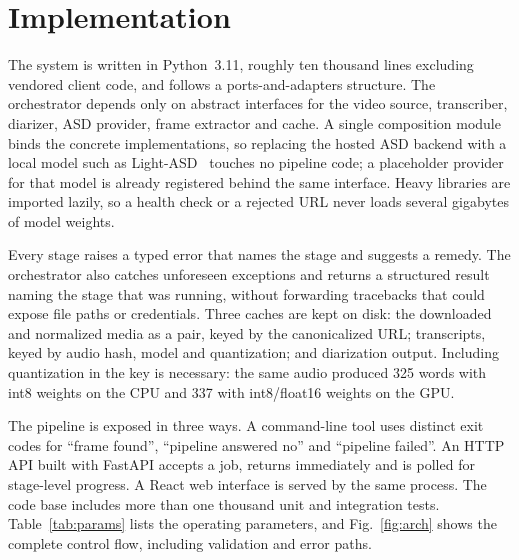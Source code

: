 \documentclass[conference]{IEEEtran}
\begin{document}
\section{Implementation}
\label{sec:impl}

The system is written in Python~3.11, roughly ten thousand lines excluding vendored client code, and follows a ports-and-adapters structure. The orchestrator depends only on abstract interfaces for the video source, transcriber, diarizer, ASD provider, frame extractor and cache. A single composition module binds the concrete implementations, so replacing the hosted ASD backend with a local model such as Light-ASD~\cite{liao2023lightasd} touches no pipeline code; a placeholder provider for that model is already registered behind the same interface. Heavy libraries are imported lazily, so a health check or a rejected URL never loads several gigabytes of model weights.

Every stage raises a typed error that names the stage and suggests a remedy. The orchestrator also catches unforeseen exceptions and returns a structured result naming the stage that was running, without forwarding tracebacks that could expose file paths or credentials. Three caches are kept on disk: the downloaded and normalized media as a pair, keyed by the canonicalized URL; transcripts, keyed by audio hash, model and quantization; and diarization output. Including quantization in the key is necessary: the same audio produced 325 words with int8 weights on the CPU and 337 with int8/float16 weights on the GPU.

The pipeline is exposed in three ways. A command-line tool uses distinct exit codes for ``frame found'', ``pipeline answered no'' and ``pipeline failed''. An HTTP API built with FastAPI accepts a job, returns immediately and is polled for stage-level progress. A React web interface is served by the same process. The code base includes more than one thousand unit and integration tests. Table~\ref{tab:params} lists the operating parameters, and Fig.~\ref{fig:arch} shows the complete control flow, including validation and error paths.
\end{document}
